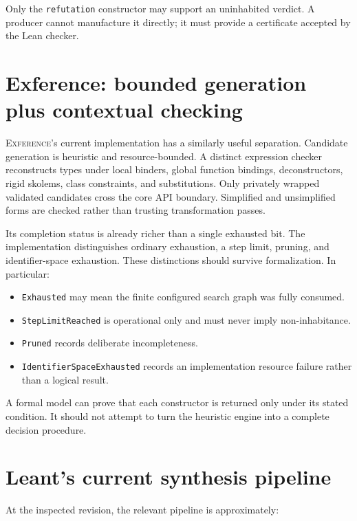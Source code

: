 \documentclass[11pt,letterpaper,openany]{report}
\theoremstyle{definition}
\theoremstyle{remark}
\newcommand{\Exference}{\textsc{Exference}}
\newcommand{\code}[1]{\texttt{#1}}
\begin{document}
Only the \code{refutation} constructor may support an uninhabited verdict. A producer cannot manufacture it directly; it must provide a certificate accepted by the Lean checker.

\section{Exference: bounded generation plus contextual checking}

\Exference's current implementation has a similarly useful separation. Candidate generation is heuristic and resource-bounded. A distinct expression checker reconstructs types under local binders, global function bindings, deconstructors, rigid skolems, class constraints, and substitutions. Only privately wrapped validated candidates cross the core API boundary. Simplified and unsimplified forms are checked rather than trusting transformation passes.

Its completion status is already richer than a single exhausted bit. The implementation distinguishes ordinary exhaustion, a step limit, pruning, and identifier-space exhaustion. These distinctions should survive formalization. In particular:

\begin{itemize}
\item \code{Exhausted} may mean the finite configured search graph was fully consumed.
\item \code{StepLimitReached} is operational only and must never imply non-inhabitance.
\item \code{Pruned} records deliberate incompleteness.
\item \code{IdentifierSpaceExhausted} records an implementation resource failure rather than a logical result.
\end{itemize}

A formal model can prove that each constructor is returned only under its stated condition. It should not attempt to turn the heuristic engine into a complete decision procedure.

\section{Leant's current synthesis pipeline}
\label{sec:current-leant}

At the inspected revision, the relevant pipeline is approximately:
\end{document}
